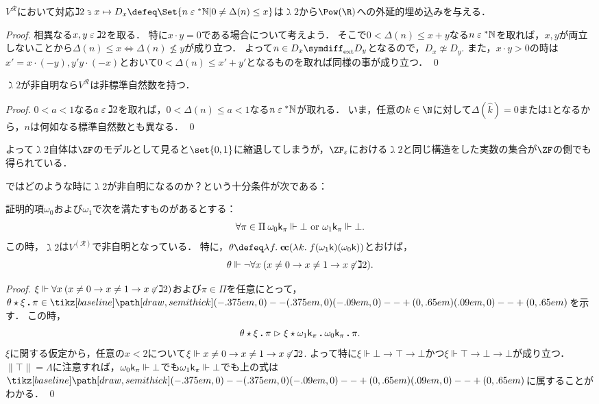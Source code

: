 \documentclass[realisability.tex]{subfiles}
\begin{document}
\begin{lemma}\label{lem:D-base-ext-inj}
 $V^{\mathcal{R}}$において対応$\gimel 2 \strni x \mapsto D_x \defeq \Set{n \strin \NN | 0 \neq \Delta(n) \leq x}$は$\gimel2$から$\Pow(\R)$への外延的埋め込みを与える．
\end{lemma}
\begin{proof}
 相異なる$x, y \mathrel{\varepsilon} \gimel 2$を取る．
 特に$x \cdot y = 0$である場合について考えよう．
 そこで$0 < \Delta(n) \leq x + y$なる$n \mathrel{\varepsilon} \mathord{{}^{*}\mathbb{N}}$を取れば，$x, y$が両立しないことから$\Delta(n) \leq x \iff \Delta(n) \nleq y$が成り立つ．
 よって$n \in D_x \symdiff_{\text{ext}} D_y$となるので，$D_x \not\simeq D_y$.
 また，$x \cdot y > 0$の時は$x' = x \cdot (- y), y' y \cdot (- x)$とおいて$0 < \Delta(n) \leq x' + y'$となるものを取れば同様の事が成り立つ． \qed
\end{proof}
\begin{corollary}\label{cor:nonstd-natural}
 $\gimel 2$が非自明なら$V^{\mathcal{R}}$は非標準自然数を持つ．
\end{corollary}
\begin{proof}
 $0 < a < 1$なる$a \mathrel{\varepsilon} \gimel 2$を取れば，$0 < \Delta(n) \leq a < 1$なる$n \mathrel{\varepsilon} \mathord{{}^{*}\mathbb{N}}$が取れる．
 いま，任意の$k \in \N$に対して$\Delta(\hat{k}) = 0$または$1$となるから，$n$は何如なる標準自然数とも異なる． \qed
\end{proof}
よって$\gimel 2$自体は$\ZF$のモデルとして見ると$\set{0, 1}$に縮退してしまうが，$\ZFe$における$\gimel 2$と同じ構造をした実数の集合が$\ZF$の側でも得られている．

ではどのような時に$\gimel 2$が非自明になるのか？という十分条件が次である：
\begin{lemma}\label{lem:gimel2-nontriv}
 証明的項$\omega_0$および$\omega_1$で次を満たすものがあるとする：
 \[
  \forall \pi \in \Pi \: \omega_0 \mathsf{k}_\pi \Vdash \bot \text{ or } \omega_1 \mathsf{k}_\pi \Vdash \bot.
 \]
 この時，$\gimel 2$は$V^{(\mathcal{R})}$で非自明となっている．
 特に，$\theta \defeq \abs{f}{\cc (\abs{k}{f(\omega_1 \conti)(\omega_0 \conti)})}$とおけば，
 \[
  \theta \Vdash \neg \forall x \: (x \neq 0 \to x \neq 1 \to x \not\mathrel{\varepsilon} \gimel 2).
 \]
\end{lemma}
\begin{proof}
 $\xi \Vdash \forall x \: (x \neq 0 \to x \neq 1 \to x \not\mathrel{\varepsilon} \gimel 2)$および$\pi \in \Pi$を任意にとって，$\theta \cons \xi \push \pi\in \pole$を示す．
 この時，
 \[
  {\theta \mathbin{\star} \xi \mathbin{\boldsymbol{.}} \pi}
  \mathrel{\rhd} {\xi \mathbin{\star} {\omega_1 \mathsf{k}_{\pi}} \mathbin{\boldsymbol{.}} {\omega_0 \mathsf{k}_{\pi}} \mathbin{\boldsymbol{.}} \pi}.
 \]
 $\xi$に関する仮定から，任意の$x < 2$について$\xi \Vdash x \neq 0 \to x \neq 1 \to x \not\mathrel{\varepsilon} \gimel 2$.
 よって特に$\xi \Vdash \bot \to \top \to \bot$かつ$\xi \Vdash \top \to \bot \to \bot$が成り立つ．
 $\|\top\| = \Lambda$に注意すれば，$\omega_0 \mathsf{k}_\pi \Vdash \bot$でも$\omega_1 \mathsf{k}_\pi \Vdash \bot$でも上の式は$\pole$に属することがわかる． \qed
\end{proof}
\end{document}
